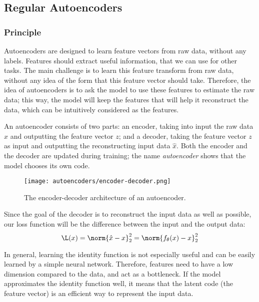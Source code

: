\subsection{Regular Autoencoders}
\subsubsection{Principle}
Autoencoders are designed to learn feature vectors from raw data, without any labels. Features should extract useful information, that we can use for other tasks. The main challenge is to learn this feature transform from raw data, without any idea of the form that this feature vector should take. Therefore, the idea of autoencoders is to ask the model to use these features to estimate the raw data; this way, the model will keep the features that will help it reconstruct the data, which can be intuitively considered as the  features.

An autoencoder consists of two parts: an encoder, taking into input the raw data $x$ and outputting the feature vector $z$; and a decoder, taking the feature vector $z$ as input and outputting the reconstructing input data $\hat{x}$. Both the encoder and the decoder are updated during training; the name \emph{autoencoder} shows that the model chooses its own code.
\begin{figure}[H]
    \centering
    \texttt{[image: autoencoders/encoder-decoder.png]}
    \caption{The encoder-decoder architecture of an autoencoder.}
\end{figure}
Since the goal of the decoder is to reconstruct the input data as well as possible, our loss function will be the difference between the input and the output data:
\begin{equation*}
    \L(x) = \norm{\hat{x}-x}_2^2 = \norm{f_\theta(x)-x}_2^2
\end{equation*}

In general, learning the identity function is not especially useful and can be easily learned by a simple neural network. Therefore, features need to have a low dimension compared to the data, and act as a bottleneck. If the model approximates the identity function well, it means that the latent code (the feature vector) is an efficient way to represent the input data.

